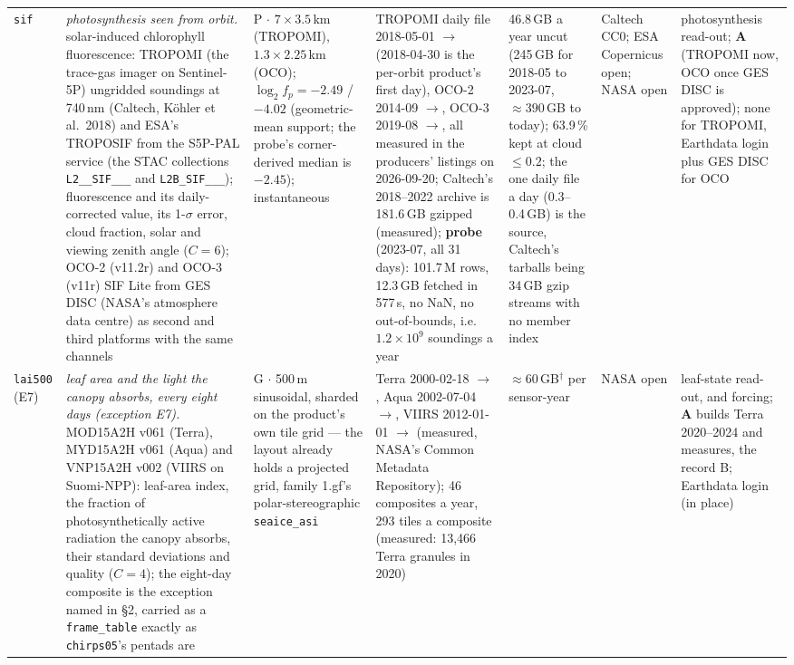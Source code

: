 \documentclass[10pt]{article}
\newcommand{\code}[1]{\texttt{#1}}
\begin{document}
{\begin{longtable}{@{}L{1.3cm}L{4.55cm}L{1.95cm}L{2.45cm}L{1.35cm}L{1.3cm}L{2.2cm}@{}}
\code{sif} & \emph{photosynthesis seen from orbit.} solar-induced chlorophyll fluorescence: TROPOMI (the trace-gas imager on Sentinel-5P) ungridded soundings at 740\,nm (Caltech, K\"ohler et al.\ 2018) and ESA's TROPOSIF from the S5P-PAL service (the STAC collections \code{L2\_\_SIF\_\_\_} and \code{L2B\_SIF\_\_\_}); fluorescence and its daily-corrected value, its 1-$\sigma$ error, cloud fraction, solar and viewing zenith angle ($C = 6$); OCO-2 (v11.2r) and OCO-3 (v11r) SIF Lite from GES DISC (NASA's atmosphere data centre) as second and third platforms with the same channels & P $\cdot$ $7 \times 3.5$\,km (TROPOMI), $1.3 \times 2.25$\,km (OCO); $\log_2 f_p = -2.49$ / $-4.02$ (geometric-mean support; the probe's corner-derived median is $-2.45$); instantaneous & TROPOMI daily file 2018-05-01 $\to$ (2018-04-30 is the per-orbit product's first day), OCO-2 2014-09 $\to$, OCO-3 2019-08 $\to$, all measured in the producers' listings on 2026-09-20; Caltech's 2018--2022 archive is 181.6\,GB gzipped (measured); \textbf{probe} (2023-07, all 31 days): 101.7\,M rows, 12.3\,GB fetched in 577\,s, no NaN, no out-of-bounds, i.e.\ $1.2 \times 10^9$ soundings a year & 46.8\,GB a year uncut (245\,GB for 2018-05 to 2023-07, $\approx 390$\,GB to today); 63.9\,\% kept at cloud $\le 0.2$; the one daily file a day (0.3--0.4\,GB) is the source, Caltech's tarballs being 34\,GB gzip streams with no member index & Caltech CC0; ESA Copernicus open; NASA open & photosynthesis read-out; \textbf{A} (TROPOMI now, OCO once GES DISC is approved); none for TROPOMI, Earthdata login plus GES DISC for OCO \\
\code{lai500} (E7) & \emph{leaf area and the light the canopy absorbs, every eight days (exception E7).} MOD15A2H v061 (Terra), MYD15A2H v061 (Aqua) and VNP15A2H v002 (VIIRS on Suomi-NPP): leaf-area index, the fraction of photosynthetically active radiation the canopy absorbs, their standard deviations and quality ($C = 4$); the eight-day composite is the exception named in \S2, carried as a \code{frame\_table} exactly as \code{chirps05}'s pentads are & G $\cdot$ 500\,m sinusoidal, sharded on the product's own tile grid --- the layout already holds a projected grid, family 1.gf's polar-stereographic \code{seaice\_asi} & Terra 2000-02-18 $\to$, Aqua 2002-07-04 $\to$, VIIRS 2012-01-01 $\to$ (measured, NASA's Common Metadata Repository); 46 composites a year, 293 tiles a composite (measured: 13,466 Terra granules in 2020) & $\approx 60$\,GB$^\dagger$ per sensor-year & NASA open & leaf-state read-out, and forcing; \textbf{A} builds Terra 2020--2024 and measures, the record B; Earthdata login (in place) \\

\end{longtable}}
\end{document}
